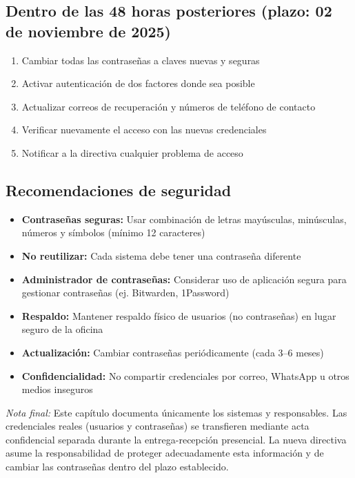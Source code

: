 \subsection*{Dentro de las 48 horas posteriores (plazo: 02 de noviembre de 2025)}

\begin{enumerate}
  \item Cambiar todas las contraseñas a claves nuevas y seguras
  \item Activar autenticación de dos factores donde sea posible
  \item Actualizar correos de recuperación y números de teléfono de contacto
  \item Verificar nuevamente el acceso con las nuevas credenciales
  \item Notificar a la directiva cualquier problema de acceso
\end{enumerate}

\subsection*{Recomendaciones de seguridad}

\begin{itemize}
  \item \textbf{Contraseñas seguras:} Usar combinación de letras mayúsculas, minúsculas, números y símbolos (mínimo 12 caracteres)
  \item \textbf{No reutilizar:} Cada sistema debe tener una contraseña diferente
  \item \textbf{Administrador de contraseñas:} Considerar uso de aplicación segura para gestionar contraseñas (ej. Bitwarden, 1Password)
  \item \textbf{Respaldo:} Mantener respaldo físico de usuarios (no contraseñas) en lugar seguro de la oficina
  \item \textbf{Actualización:} Cambiar contraseñas periódicamente (cada 3--6 meses)
  \item \textbf{Confidencialidad:} No compartir credenciales por correo, WhatsApp u otros medios inseguros
\end{itemize}

\textit{Nota final:} Este capítulo documenta únicamente los sistemas y responsables. Las credenciales reales (usuarios y contraseñas) se transfieren mediante acta confidencial separada durante la entrega-recepción presencial. La nueva directiva asume la responsabilidad de proteger adecuadamente esta información y de cambiar las contraseñas dentro del plazo establecido.
